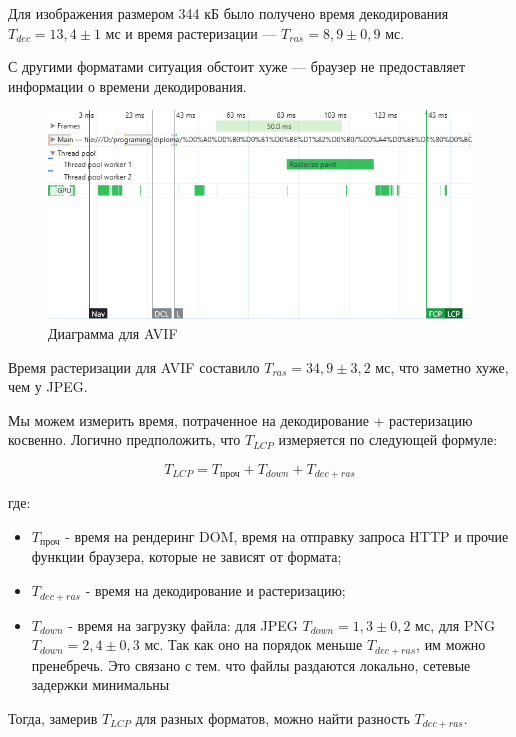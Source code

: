 \documentclass[12pt]{article}
\begin{document}
Для изображения размером 344 кБ было получено время декодирования
$T_{dec} = 13,4 \pm 1$ мс и время растеризации — $T_{ras} = 8,9 \pm 0,9$ мс.

С другими форматами ситуация обстоит хуже — браузер не предоставляет информации
о времени декодирования.

\begin{figure}[H]
    \centering
    \includegraphics[width=1\textwidth]{../images/image_comp/avif_one_image.png}
    \caption{Диаграмма для AVIF}
\end{figure}

Время растеризации для AVIF составило $T_{ras} = 34,9 \pm 3,2$ мс,
что заметно хуже, чем у JPEG.

Мы можем измерить время, потраченное на декодирование + растеризацию косвенно.
Логично предположить, что $T_{LCP}$ измеряется по следующей формуле:

\[
    T_{LCP} = T_{\text{проч}} + T_{down} + T_{dec+ras}
\]

где:

\begin{itemize}
    \item $T_{\text{проч}}$ - время на рендеринг DOM, время на отправку
          запроса HTTP и прочие
          функции браузера, которые не зависят от формата;
    \item $T_{dec+ras}$ - время на декодирование и растеризацию;
    \item $T_{down}$ - время на загрузку файла: для JPEG $T_{down} = 1{,}3 \pm 0{,}2 \text{ мс}$,
          для PNG $T_{down} = 2{,}4 \pm 0{,}3 \text{ мс}$. Так как оно на порядок меньше $T_{dec+ras}$,
          им можно пренебречь. Это связано с тем. что файлы раздаются локально, сетевые задержки минимальны
\end{itemize}

Тогда, замерив $T_{LCP}$ для разных форматов, можно найти разность $T_{dec+ras}$.
\end{document}
